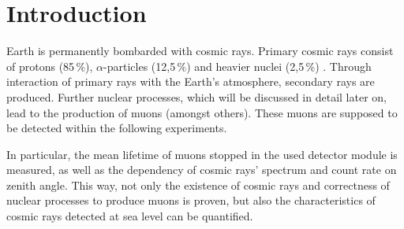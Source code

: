 \section{Introduction}

Earth is permanently bombarded with cosmic rays. Primary cosmic rays consist of protons (85\,\%), $\alpha$-particles (12,5\,\%) and heavier nuclei (2,5\,\%) \cite{wwu}.
Through interaction of primary rays with the Earth's atmosphere, secondary rays are produced.
Further nuclear processes, which will be discussed in detail later on, lead to the production of muons (amongst others).
These muons are supposed to be detected within the following experiments.

In particular, the mean lifetime of muons stopped in the used detector module is measured, as well as the dependency of cosmic rays' spectrum and count rate on zenith angle.
This way, not only the existence of cosmic rays and correctness of nuclear processes to produce muons is proven, but also the characteristics of cosmic rays detected at sea level can be quantified.



